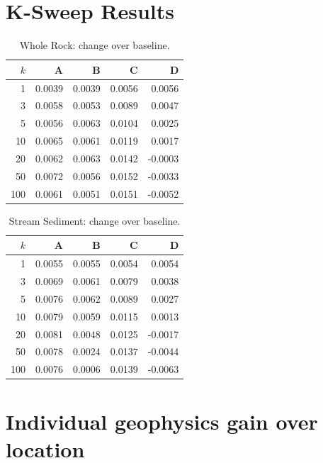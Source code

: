 \appendix

\section{K-Sweep Results}
\label{app:k-sweep}

\begin{table}[H]
  \centering
  \caption{Whole Rock: change over baseline.}
  \label{tab:whole-rock-delta}
  \begin{tabular}{rrrrr}
    \toprule
    $k$ & A & B & C & D \\
    \midrule
    1 & 0.0039 & 0.0039 & 0.0056 & 0.0056 \\
3 & 0.0058 & 0.0053 & 0.0089 & 0.0047 \\
5 & 0.0056 & 0.0063 & 0.0104 & 0.0025 \\
10 & 0.0065 & 0.0061 & 0.0119 & 0.0017 \\
20 & 0.0062 & 0.0063 & 0.0142 & -0.0003 \\
50 & 0.0072 & 0.0056 & 0.0152 & -0.0033 \\
100 & 0.0061 & 0.0051 & 0.0151 & -0.0052 \\
    \bottomrule
  \end{tabular}
\end{table}

\begin{table}[H]
  \centering
  \caption{Stream Sediment: change over baseline.}
  \label{tab:stream-sediment-delta}
  \begin{tabular}{rrrrr}
    \toprule
    $k$ & A & B & C & D \\
    \midrule
    1 & 0.0055 & 0.0055 & 0.0054 & 0.0054 \\
3 & 0.0069 & 0.0061 & 0.0079 & 0.0038 \\
5 & 0.0076 & 0.0062 & 0.0089 & 0.0027 \\
10 & 0.0079 & 0.0059 & 0.0115 & 0.0013 \\
20 & 0.0081 & 0.0048 & 0.0125 & -0.0017 \\
50 & 0.0078 & 0.0024 & 0.0137 & -0.0044 \\
100 & 0.0076 & 0.0006 & 0.0139 & -0.0063 \\
    \bottomrule
  \end{tabular}
\end{table}

\section{Individual geophysics gain over location}
\label{app:geophysics-vs-location-individual}

